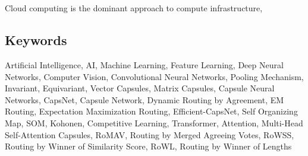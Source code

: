 \chapter*{}
\begin{otherlanguage}{english}
	

	Cloud computing is the dominant approach to compute infrastructure,

	\section*{Keywords}

	\noindent
Artificial Intelligence, AI, Machine Learning, Feature Learning, Deep Neural Networks, Computer Vision, Convolutional Neural Networks, Pooling Mechanism, Invariant, Equivariant, Vector Capsules, Matrix Capsules, Capsule Neural Networks, CapsNet, Capsule Network, Dynamic Routing by Agreement, EM Routing, Expectation Maximization Routing, Efficient-CapsNet, Self Organizing Map, SOM, Kohonen, Competitive Learning, Transformer, Attention, Multi-Head Self-Attention Capsules, RoMAV, Routing by Merged Agreeing Votes, RoWSS, Routing by Winner of Similarity Score, RoWL, Routing by Winner of Lengths
\end{otherlanguage}
